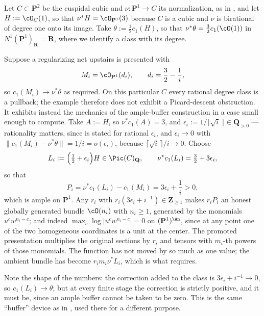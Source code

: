 \begin{example}
\label{ex:ch43-promotion-numbers}
Let $C\subset\mathbf P^2$ be the cuspidal cubic and
$\nu:\mathbf P^1\to C$ its normalization, as in
, and let $H:=\cO_C(1)$, so that
$\nu^*H=\cO_{\mathbf P^1}(3)$ because $C$ is a cubic and $\nu$ is
birational of degree one onto its image.  Take
$\theta:=\tfrac12c_1(H)$, so that $\nu^*\theta=\tfrac32c_1(\cO(1))$ in
$N^1(\mathbf P^1)_{\mathbf R}=\mathbf R$, where we identify a class with
its degree.

Suppose a regularizing net upstairs is presented with
\[
 M_i=\cO_{\mathbf P^1}(d_i),
 \qquad
 d_i=\frac32-\frac1{i},
\]
so $c_1(M_i)\to\nu^*\theta$ as required.  On this particular $C$ every
rational degree class is a pullback; the example therefore does not exhibit
a Picard-descent obstruction.  It exhibits instead the mechanics of the
ample-buffer construction in a case small enough to compute.  Take
$A:=H$, so
$\nu^*c_1(A)=3$, and $\epsilon_i:=1/\lceil\sqrt i\,\rceil\in\mathbf
Q_{>0}$ --- rationality matters, since
 is stated for rational
$\epsilon_i$, and $\epsilon_i\to0$ with
$\lVert c_1(M_i)-\nu^*\theta\rVert=1/i=o(\epsilon_i)$, because
$\lceil\sqrt i\,\rceil/i\to0$.  Choose
\[
 L_i:=\Bigl(\tfrac12+\epsilon_i\Bigr)H
 \in\Pic(C)_{\mathbf Q},
 \qquad
 \nu^*c_1(L_i)=\tfrac32+3\epsilon_i,
\]
so that
\[
 P_i=\nu^*c_1(L_i)-c_1(M_i)
    =3\epsilon_i+\frac1i>0,
\]
which is ample on $\mathbf P^1$.  Any $r_i$ with
$r_i(3\epsilon_i+i^{-1})\in\mathbf Z_{\ge1}$ makes $r_iP_i$ an honest
globally generated bundle $\cO(n_i)$ with $n_i\ge1$, generated by the
monomials $u^cw^{n_i-c}$; and indeed
$\max_c\log|u^cw^{n_i-c}|=0$ on $(\mathbf P^1)^{\An}$, since at any point
one of the two homogeneous coordinates is a unit at the center.  The
promoted presentation multiplies the original sections by $r_i$ and tensors
with $m_i$-th powers of those monomials.  The function has not moved by so
much as one value; the ambient bundle has become
$r_im_i\nu^*L_i$, which is what  requires.

Note the shape of the numbers: the correction added to the class is
$3\epsilon_i+i^{-1}\to0$, so $c_1(L_i)\to\theta$; but at every finite
stage the correction is strictly positive, and it must be, since an ample
buffer cannot be taken to be zero.  This is the same ``buffer'' device as in
, used there for a different purpose.
\end{example}

